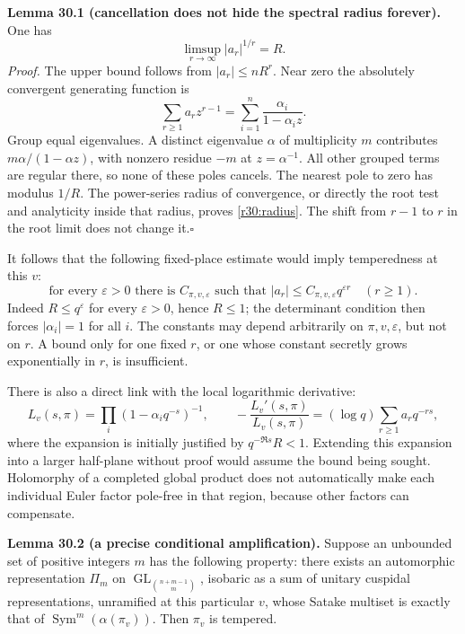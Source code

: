 \documentclass[11pt,a4paper]{article}
\numberwithin{equation}{section}
\begin{document}
\textbf{Lemma 30.1 (cancellation does not hide the spectral radius forever).}
One has
\begin{equation}\label{r30:radius}
                  \limsup_{r\to\infty}|a_r|^{1/r}=R.
\end{equation}
\emph{Proof.} The upper bound follows from $|a_r|\le nR^r$.
Near zero the absolutely convergent generating function is
\[
 \sum_{r\ge1}a_r z^{r-1}=\sum_{i=1}^n\frac{\alpha_i}{1-\alpha_i z}.
\]
Group equal eigenvalues. A distinct eigenvalue $\alpha$ of multiplicity
$m$ contributes $m\alpha/(1-\alpha z)$, with nonzero residue $-m$ at
$z=\alpha^{-1}$. All other grouped terms are regular there, so none of
these poles cancels. The nearest pole to zero has modulus $1/R$.
The power-series radius of convergence, or directly the root test and
analyticity inside that radius, proves \eqref{r30:radius}. The shift from
$r-1$ to $r$ in the root limit does not change it.\hfill$\square$

It follows that the following fixed-place estimate would imply temperedness
at this $v$:
\begin{equation}\label{r30:powerbound}
 \text{for every }\varepsilon>0\text{ there is }C_{\pi,v,\varepsilon}
 \text{ such that }|a_r|\le C_{\pi,v,\varepsilon}q^{\varepsilon r}
 \quad(r\ge1).
\end{equation}
Indeed $R\le q^\varepsilon$ for every $\varepsilon>0$, hence $R\le1$;
the determinant condition then forces $|\alpha_i|=1$ for all $i$.
The constants may depend arbitrarily on $\pi,v,\varepsilon$, but not on
$r$. A bound only for one fixed $r$, or one whose constant secretly grows
exponentially in $r$, is insufficient.

There is also a direct link with the local logarithmic derivative:
\[
 L_v(s,\pi)=\prod_i(1-\alpha_iq^{-s})^{-1},\qquad
 -\frac{L_v'(s,\pi)}{L_v(s,\pi)}
       =(\log q)\sum_{r\ge1}a_rq^{-rs},
\]
where the expansion is initially justified by $q^{-\Re s}R<1$.
Extending this expansion into a larger half-plane without proof would
assume the bound being sought. Holomorphy of a completed global product
does not automatically make each individual Euler factor pole-free in
that region, because other factors can compensate.

\medskip
\textbf{Lemma 30.2 (a precise conditional amplification).}
Suppose an unbounded set of positive integers $m$ has the following
property: there exists an automorphic representation $\Pi_m$ on
$\operatorname{GL}_{\binom{n+m-1}{m}}$, isobaric as a sum of unitary
cuspidal representations, unramified at this particular $v$, whose
Satake multiset is exactly that of $\operatorname{Sym}^m(\alpha(\pi_v))$.
Then $\pi_v$ is tempered.
\end{document}
